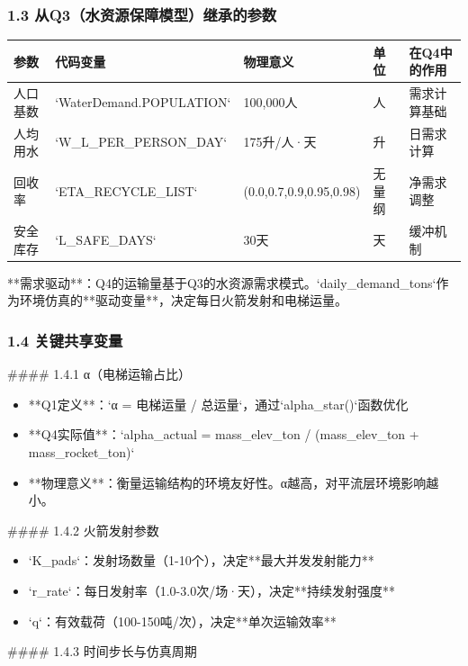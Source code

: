 \documentclass[a4paper,12pt]{article}
\begin{document}
\subsubsection{1.3 从Q3（水资源保障模型）继承的参数}
\begin{center}
\begin{longtable}{|l|l|l|l|l|}
\hline
参数 & 代码变量 & 物理意义 & 单位 & 在Q4中的作用 \\ \hline
人口基数 & `WaterDemand.POPULATION` & 100,000人 & 人 & 需求计算基础 \\ \hline
人均用水 & `W_L_PER_PERSON_DAY` & 175升/人·天 & 升 & 日需求计算 \\ \hline
回收率 & `ETA_RECYCLE_LIST` & (0.0,0.7,0.9,0.95,0.98) & 无量纲 & 净需求调整 \\ \hline
安全库存 & `L_SAFE_DAYS` & 30天 & 天 & 缓冲机制 \\ \hline
\end{longtable}
\end{center}
**需求驱动**：Q4的运输量基于Q3的水资源需求模式。`daily\_demand\_tons`作为环境仿真的**驱动变量**，决定每日火箭发射和电梯运量。

\par
\subsubsection{1.4 关键共享变量}
#### 1.4.1 α（电梯运输占比）

\par
\begin{itemize}
\item **Q1定义**：`α = 电梯运量 / 总运量`，通过`alpha_star()`函数优化
\end{itemize}
\begin{itemize}
\item **Q4实际值**：`alpha_actual = mass_elev_ton / (mass_elev_ton + mass_rocket_ton)`
\end{itemize}
\begin{itemize}
\item **物理意义**：衡量运输结构的环境友好性。α越高，对平流层环境影响越小。
\end{itemize}
#### 1.4.2 火箭发射参数

\par
\begin{itemize}
\item `K_pads`：发射场数量（1-10个），决定**最大并发发射能力**
\end{itemize}
\begin{itemize}
\item `r_rate`：每日发射率（1.0-3.0次/场·天），决定**持续发射强度**
\end{itemize}
\begin{itemize}
\item `q`：有效载荷（100-150吨/次），决定**单次运输效率**
\end{itemize}
#### 1.4.3 时间步长与仿真周期
\end{document}
